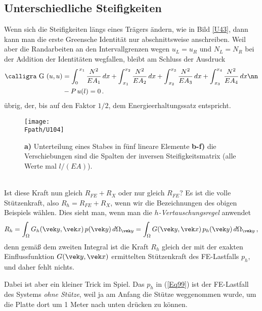 {{{%
{\textcolor{blau2}{\section{Unterschiedliche Steifigkeiten}}}
Wenn sich die Steifigkeiten l\"{a}ngs eines Tr\"{a}gers \"{a}ndern, wie in Bild \ref{U43}, dann kann man die erste Greensche Identit\"{a}t nur abschnittsweise anschreiben. Weil aber die Randarbeiten an den Intervallgrenzen wegen $u_L = u_R$ und $N_L = N_R$ bei der Addition der Identit\"{a}ten wegfallen, bleibt am Schluss der Ausdruck
\begin{align}
\text{\normalfont\calligra G\,\,}(u,u) &= \int_0^{\,x_1} \frac{N^2}{EA_1}\,dx + \int_{\,x_1}^{x_2} \frac{N^2}{EA_2}\,dx +\int_{\,x_2}^{x_3} \frac{N^2}{EA_3}\,dx + \int_{\,x_3}^{x_4} \frac{N^2}{EA_4}\,dx \nn \\
&-P\,u(l) = 0\,.
\end{align}
\"{u}brig, der, bis auf den Faktor $1/2$, dem Energieerhaltungssatz entspricht.

\begin{figure}
\centering
{\texttt{[image: \\Fpath/U104]}}
  \caption{\textbf{ a)} Unterteilung eines Stabes in f\"{u}nf lineare Elemente
  \textbf{ b-f)} die Verschiebungen sind die Spalten der inversen Steifigkeitsmatrix (alle Werte mal $l/(EA)$).}
  \label{U104}
%
\end{figure}%
\\


Ist diese Kraft nun gleich $R_{FE} + R_{X}$ oder nur gleich $R_{FE}$? Es ist die volle St\"{u}tzenkraft, also $R_h = R_{FE} + R_{X}$, wenn wir die Bezeichnungen des obigen Beispiels w\"{a}hlen. Dies sieht man, wenn man die {\em $h$-Vertauschungsregel\/} anwendet
\begin{align}\label{Eq99}
R_h = \int_{\Omega} G_h(\vek y,\vek x)\,p(\vek y)\,d\Omega_{\vek y} = \int_{\Omega} G(\vek y,\vek x)\,p_h(\vek y)\,d\Omega_{\vek y}\,,
\end{align}
denn gem\"{a}{\ss} dem zweiten Integral ist die Kraft $R_h$ gleich der mit der exakten Einflussfunktion $G(\vek y,\vek x)$ ermittelten St\"{u}tzenkraft des FE-Lastfalls $p_h$, und daher fehlt nichts.

Dabei ist aber ein kleiner Trick im Spiel. Das $p_h$ in (\ref{Eq99}) ist der FE-Lastfall des Systems {\em ohne St\"{u}tze\/}, weil ja am Anfang die St\"{u}tze weggenommen wurde, um die Platte dort um 1 Meter nach unten dr\"{u}cken zu k\"{o}nnen.\\

}}}
